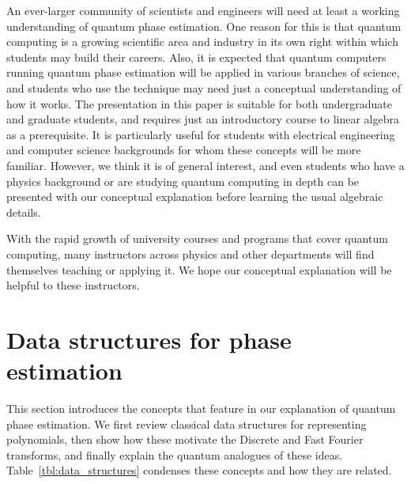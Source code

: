 \documentclass[prb,preprint]{revtex4}
\begin{document}
An ever-larger community of scientists and engineers will need at least a working understanding of quantum phase estimation. One reason for this is that quantum computing is a growing scientific area and industry in its own right within which students may build their careers. Also, it is expected that quantum computers running quantum phase estimation will be applied in various branches of science, and students who use the technique may need just a conceptual understanding of how it works. The presentation in this paper is suitable for both undergraduate and graduate students, and requires just an introductory course to linear algebra as a prerequisite. It is particularly useful for students with electrical engineering and computer science backgrounds for whom these concepts will be more familiar. 
However, we think it is of general interest, and even students who have a physics background or are studying quantum computing in depth can be presented with our conceptual explanation before learning the usual algebraic details. 

With the rapid growth of university courses and programs that cover quantum computing, many instructors across physics and other departments will find themselves teaching or applying it. We hope our conceptual explanation will be helpful to these instructors. 
	
\section{Data structures for phase estimation}

This section introduces the concepts that feature in our explanation of quantum phase estimation. We first review classical data structures for representing polynomials, then show how these motivate the Discrete and Fast Fourier transforms, and finally explain the quantum analogues of these ideas. Table~\ref{tbl:data_structures} condenses these concepts and how they are related. 
	
\end{document}

